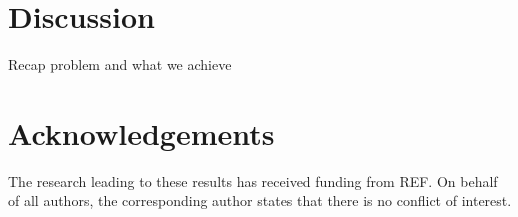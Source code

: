 \documentclass[12pt,a4paper]{article}
\theoremstyle{definition}
\theoremstyle{plain}
\theoremstyle{remark}
\begin{document}
\section{Discussion}\label{sec:discussion}
Recap problem and what we achieve

\section*{Acknowledgements}
The research leading to these results has received funding from REF.
On behalf of all authors, the corresponding author states that there is no conflict of interest.


\end{document}
